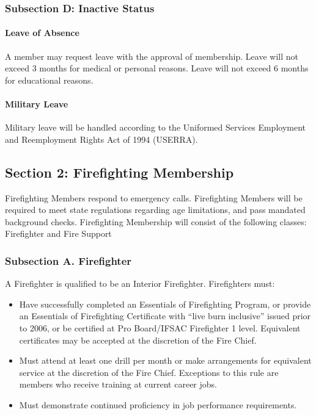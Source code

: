 ﻿\documentclass[12pt,letterpaper]{article}
\begin{document}
\subsubsection*{Subsection D: Inactive Status}
\paragraph{Leave of Absence}
A member may request leave with the approval of membership.  Leave will not exceed 3 months for medical or personal reasons.  Leave will not exceed 6 months for educational reasons. 
\paragraph{Military Leave}
Military leave will be handled according to the Uniformed Services Employment and Reemployment Rights Act of 1994 (USERRA).

\subsection*{Section 2: Firefighting Membership}
Firefighting Members respond to emergency calls.  Firefighting Members will be required to meet state regulations regarding age limitations, and pass mandated background checks.  Firefighting Membership will consist of the following classes: Firefighter and Fire Support

\subsubsection*{Subsection A. Firefighter}
A Firefighter is qualified to be an Interior Firefighter.  Firefighters must:
\begin{itemize}
\item Have successfully completed an Essentials of Firefighting Program, or provide an Essentials of Firefighting Certificate with “live burn inclusive” issued prior to 2006, or be certified at Pro Board/IFSAC Firefighter 1 level.  Equivalent certificates may be accepted at the discretion of the Fire Chief.
\item Must attend at least one drill per month or make arrangements for equivalent service at the discretion of the Fire Chief.  Exceptions to this rule are members who receive training at current career jobs.
\item Must demonstrate continued proficiency in job performance requirements.
\end{itemize}
\end{document}
